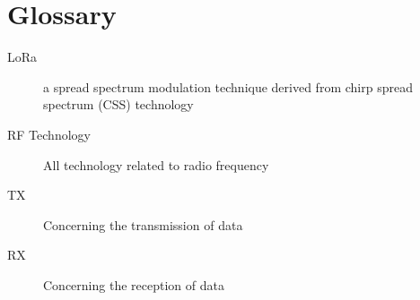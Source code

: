 \chapter*{Glossary}


\begin{description}
  \item[LoRa] a spread spectrum modulation technique derived from chirp spread spectrum (CSS) technology
  \item[RF Technology] All technology related to radio frequency
  \item[TX] Concerning the transmission of data
  \item[RX] Concerning the reception of data   
\end{description}
